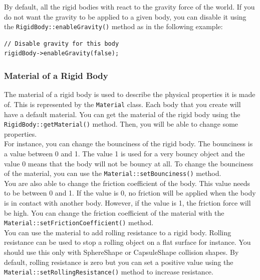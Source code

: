 \documentclass[a4paper,12pt]{article}
\begin{document}
    By default, all the rigid bodies with react to the gravity force of the world. If you do not want the gravity to be applied to a given body, you can disable
    it using the \texttt{RigidBody::enableGravity()} method as in the following example: \\

    \begin{lstlisting}
// Disable gravity for this body
rigidBody->enableGravity(false);
  \end{lstlisting}

    \subsubsection{Material of a Rigid Body}

    The material of a rigid body is used to describe the physical properties it is made of. This is represented by the \texttt{Material} class. Each body that
    you create will have a default material. You can get the material of the rigid body using the \texttt{RigidBody::getMaterial()} method. Then, you will be able to change some
    properties. \\

    For instance, you can change the bounciness of the rigid body. The bounciness is a value between 0 and 1. The value 1 is used for a very bouncy object and the value 0 means that
    the body will not be bouncy at all. To change the bounciness of the material, you can use the \texttt{Material::setBounciness()} method. \\

    You are also able to change the friction coefficient of the body. This value needs to be between 0 and 1. If the value is 0, no friction will be applied when the body is in contact with
    another body. However, if the value is 1, the friction force will be high. You can change the friction coefficient of the material with the
    \texttt{Material::setFrictionCoefficient()} method. \\

    You can use the material to add rolling resistance to a rigid body. Rolling resistance can be used to stop
    a rolling object on a flat surface for instance. You should use this only with SphereShape or
    CapsuleShape collision shapes. By default, rolling resistance is zero but you can
    set a positive value using the \texttt{Material::setRollingResistance()} method to increase resistance. \\
\end{document}

